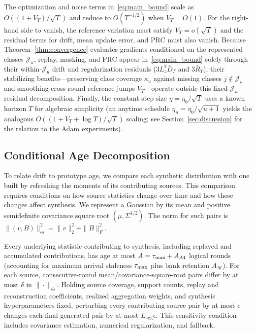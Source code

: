 The optimization and noise terms in~\eqref{eq:main_bound} scale as $O((1+V_T)/\sqrt T)$ and reduce to $O(T^{-1/2})$ when $V_T=O(1)$. For the right-hand side to vanish, the reference variation must satisfy $V_T=o(\sqrt T)$ and the residual terms for drift, mean update error, and PRC must also vanish. Because Theorem~\ref{thm:convergence} evaluates gradients conditioned on the represented classes $\mathcal J_u$, replay, masking, and PRC appear in~\eqref{eq:main_bound} solely through their within-$\mathcal J_u$ drift and regularization residuals ($3L_z^2\bar D_T$ and $3\bar R_T$); their stabilizing benefits---preserving class coverage $\kappa_u$ against missing classes $j\notin\mathcal J_u$ and smoothing cross-round reference jumps $V_T$---operate outside this fixed-$\mathcal J_u$ residual decomposition. Finally, the constant step size $\eta=\eta_0/\sqrt T$ uses a known horizon $T$ for algebraic simplicity (an anytime schedule $\eta_u=\eta_0/\sqrt{u+1}$ yields the analogous $O((1+V_T+\log T)/\sqrt T)$ scaling; see Section~\ref{sec:discussion} for the relation to the Adam experiments).

\subsection{Conditional Age Decomposition}

To relate drift to prototype age, we compare each synthetic distribution with one built by refreshing the moments of its contributing sources. This comparison requires conditions on how source statistics change over time and how these changes affect synthesis. We represent a Gaussian by its mean and positive semidefinite covariance square root $(\mu,\Sigma^{1/2})$. The norm for such pairs is $\|(v,B)\|_\oplus^2=\|v\|_2^2+\|B\|_F^2$.

\begin{assumption}
\label{asm:staleness}
Every underlying statistic contributing to synthesis, including replayed and accumulated contributions, has age at most
$A=\tau_{\max}+A_{\mathcal M}$ logical rounds (accounting for maximum arrival staleness $\tau_{\max}$ plus bank retention $A_{\mathcal M}$).
For each source, consecutive-round mean/covariance-square-root pairs differ by at most $\delta$ in $\|\cdot\|_\oplus$.
Holding source coverage, support counts, replay and reconstruction coefficients, realized aggregation weights, and synthesis hyperparameters fixed, perturbing every contributing source pair by at most $\epsilon$ changes each final generated pair by at most $L_{\mathrm{agg}}\epsilon$. This sensitivity condition includes covariance estimation, numerical regularization, and fallback.
\end{assumption}

